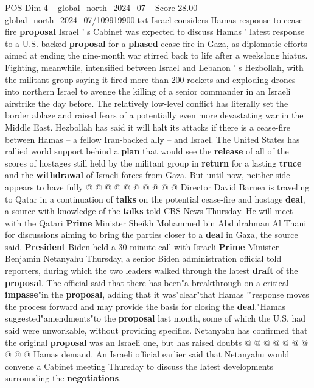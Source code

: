 \begin{textsample}{POS Dim 4 – global\_north\_2024\_07 – Score 28.00 – global\_north\_2024\_07/109919900.txt}  \label{ex:f4_pos_191}
Israel considers Hamas response to cease-fire \textbf{proposal} Israel ' s Cabinet was expected to discuss Hamas ' latest response to a U.S.-backed \textbf{proposal} for a \textbf{phased} cease-fire in Gaza, as diplomatic efforts aimed at ending the nine-month war stirred back to life after a weekslong hiatus.
Fighting, meanwhile, intensified between Israel and Lebanon ' s Hezbollah, with the militant group saying it fired more than 200 rockets and exploding drones into northern Israel to avenge the killing of a senior commander in an Israeli airstrike the day before.
The relatively low-level conflict has literally set the border ablaze and raised fears of a potentially even more devastating war in the Middle East.
Hezbollah has said it will halt its attacks if there is a cease-fire between Hamas -- a fellow Iran-backed ally -- and Israel.
The United States has rallied world support behind a \textbf{plan} that would see the \textbf{release} of all of the scores of hostages still held by the militant group in \textbf{return} for a lasting \textbf{truce} and the \textbf{withdrawal} of Israeli forces from Gaza.
But until now, neither side appears to have fully @ @ @ @ @ @ @ @ @ @ Director David Barnea is traveling to Qatar in a continuation of \textbf{talks} on the potential cease-fire and hostage \textbf{deal}, a source with knowledge of the \textbf{talks} told CBS News Thursday.
He will meet with the Qatari \textbf{Prime} Minister Sheikh Mohammed bin Abdulrahman Al Thani for discussions aiming to bring the parties closer to a \textbf{deal} in Gaza, the source said. \textbf{President} Biden held a 30-minute call with Israeli \textbf{Prime} Minister Benjamin Netanyahu Thursday, a senior Biden administration official told reporters, during which the two leaders walked through the latest \textbf{draft} of the \textbf{proposal}.
The official said that there has been"a breakthrough on a critical \textbf{impasse}"in the \textbf{proposal}, adding that it was"clear"that Hamas '"response moves the process forward and may provide the basis for closing the \textbf{deal}."Hamas suggested"amendments"to the \textbf{proposal} last month, some of which the U.S. had said were unworkable, without providing specifics.
Netanyahu has confirmed that the original \textbf{proposal} was an Israeli one, but has raised doubts @ @ @ @ @ @ @ @ @ @ Hamas demand.
An Israeli official earlier said that Netanyahu would convene a Cabinet meeting Thursday to discuss the latest developments surrounding the \textbf{negotiations}.

\end{textsample}
